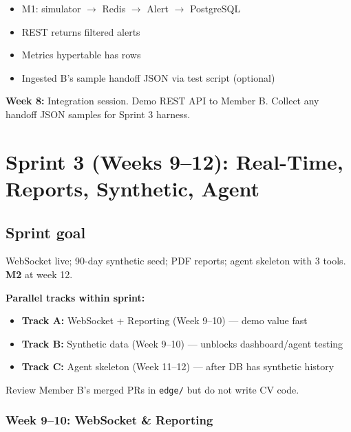 \documentclass[12pt,a4paper]{report}
\begin{document}
\begin{verifybox}
\begin{itemize}
    \item[$\square$] M1: simulator $\rightarrow$ Redis $\rightarrow$ Alert $\rightarrow$ PostgreSQL
    \item[$\square$] REST returns filtered alerts
    \item[$\square$] Metrics hypertable has rows
    \item[$\square$] Ingested B's sample handoff JSON via test script (optional)
\end{itemize}
\end{verifybox}

\begin{collabbox}
\textbf{Week 8:} Integration session. Demo REST API to Member B. Collect any handoff JSON samples for Sprint 3 harness.
\end{collabbox}

\chapter{Sprint 3 (Weeks 9--12): Real-Time, Reports, Synthetic, Agent}

\section{Sprint goal}

WebSocket live; 90-day synthetic seed; PDF reports; agent skeleton with 3 tools. \textbf{M2} at week 12.

\begin{approachbox}
\textbf{Parallel tracks within sprint:}
\begin{itemize}
    \item \textbf{Track A:} WebSocket + Reporting (Week 9--10) --- demo value fast
    \item \textbf{Track B:} Synthetic data (Week 9--10) --- unblocks dashboard/agent testing
    \item \textbf{Track C:} Agent skeleton (Week 11--12) --- after DB has synthetic history
\end{itemize}
Review Member B's merged PRs in \texttt{edge/} but do not write CV code.
\end{approachbox}

\subsection{Week 9--10: WebSocket \& Reporting}
\end{document}
